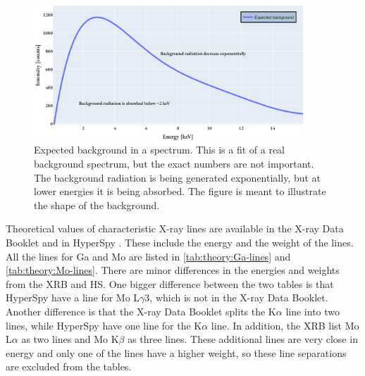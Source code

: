 \begin{figure}[p]
    \centering
    \includegraphics[width=0.9\textwidth]{figures/expected_background.png}
    \caption{
        Expected background in a spectrum.
        This is a fit of a real background spectrum, but the exact numbers are not important.
        The background radiation is being generated exponentially, but at lower energies it is being absorbed.
        The figure is meant to illustrate the shape of the background.
    }
    \label{fig:theory:expected_background}
\end{figure}




Theoretical values of characteristic X-ray lines are available in the X-ray Data Booklet \cite{thompson_x-ray_2004} and in HyperSpy \cite{hyperspy_1.7.1}.
These include the energy and the weight of the lines.
All the lines for Ga and Mo are listed in \cref{tab:theory:Ga-lines} and \cref{tab:theory:Mo-lines}.
There are minor differences in the energies and weights from the XRB and HS.
One bigger difference between the two tables is that HyperSpy have a line for Mo L$\gamma$3, which is not in the X-ray Data Booklet.
Another difference is that the X-ray Data Booklet splits the K$\alpha$ line into two lines, while HyperSpy have one line for the K$\alpha$ line.
In addition, the XRB list Mo L$\alpha$ as two lines and Mo K$\beta$ as three lines.
These additional lines are very close in energy and only one of the lines have a higher weight, so these line separations are excluded from the tables.






\clearpage











